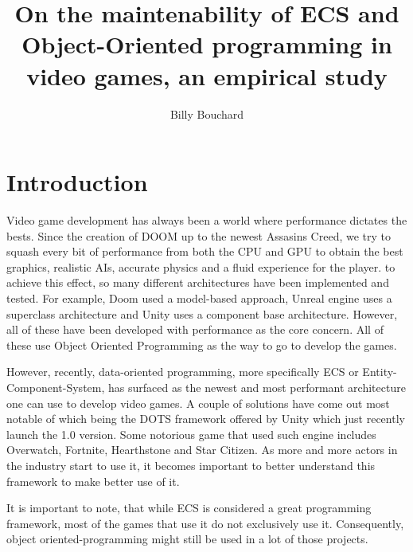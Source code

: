 \documentclass{IEEEcsmag}
\begin{document}

\title{On the maintenability of ECS and Object-Oriented programming in video games, an empirical study}

\author{Billy Bouchard}




\maketitle


\chapteri{}

\section{Introduction}

Video game development has always been a world where performance dictates the bests.
Since the creation of DOOM up to the newest Assasins Creed, we try to squash every bit of performance from both the CPU and GPU to obtain the best graphics, realistic AIs, accurate physics and a fluid experience for the player. to achieve this effect, so many different architectures have been implemented and tested. For example, Doom used a model-based approach, Unreal engine uses a superclass architecture and Unity uses a component base architecture. However, all of these have been developed with performance as the core concern. All of these use Object Oriented Programming as the way to go to develop the games.

However, recently, data-oriented programming, more specifically ECS or Entity-Component-System, has surfaced as the newest and most performant architecture one can use to develop video games. A couple of solutions have come out most notable of which being the DOTS framework offered by Unity which just recently launch the 1.0 version. Some notorious game that used such engine includes Overwatch, Fortnite, Hearthstone and Star Citizen. As more and more actors in the industry start to use it, it becomes important to better understand this framework to make better use of it.

It is important to note, that while ECS is considered a great programming framework, most of the games that use it do not exclusively use it. Consequently, object oriented-programming might still be used in a lot of those projects.
\end{document}
